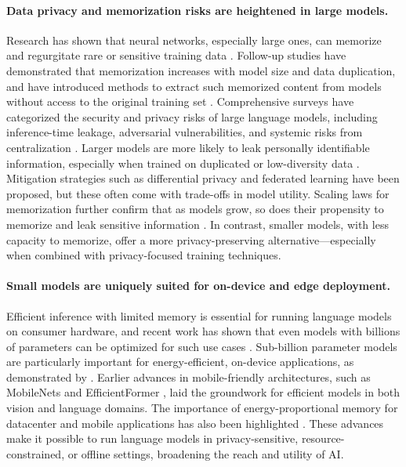 \paragraph{Data privacy and memorization risks are heightened in large models.} Research has shown that neural networks, especially large ones, can memorize and regurgitate rare or sensitive training data \citep{feldman2020neural, carlini2019secret}. Follow-up studies have demonstrated that memorization increases with model size and data duplication, and have introduced methods to extract such memorized content from models without access to the original training set \citep{carlini2021extracting, carlini2022quantifying}. Comprehensive surveys have categorized the security and privacy risks of large language models, including inference-time leakage, adversarial vulnerabilities, and systemic risks from centralization \citep{yao2024privacysurvey}. Larger models are more likely to leak personally identifiable information, especially when trained on duplicated or low-diversity data \citep{huang2022large, neel2023privacy}. Mitigation strategies such as differential privacy \citep{dwork2006calibrating} and federated learning \citep{mcmahan2017communication} have been proposed, but these often come with trade-offs in model utility. Scaling laws for memorization further confirm that as models grow, so does their propensity to memorize and leak sensitive information \citep{lu2024scaling, biderman2023emergent, kiyomaru2024comprehensive}. In contrast, smaller models, with less capacity to memorize, offer a more privacy-preserving alternative—especially when combined with privacy-focused training techniques.

\paragraph{Small models are uniquely suited for on-device and edge deployment.} Efficient inference with limited memory is essential for running language models on consumer hardware, and recent work has shown that even models with billions of parameters can be optimized for such use cases \citep{alizadeh2024llm}. Sub-billion parameter models are particularly important for energy-efficient, on-device applications, as demonstrated by \citet{liu2024mobilellm}. Earlier advances in mobile-friendly architectures, such as MobileNets \citep{howard2017mobilenets} and EfficientFormer \citep{li2022efficientformer}, laid the groundwork for efficient models in both vision and language domains. The importance of energy-proportional memory for datacenter and mobile applications has also been highlighted \citep{malladi2012towards}. These advances make it possible to run language models in privacy-sensitive, resource-constrained, or offline settings, broadening the reach and utility of AI.

